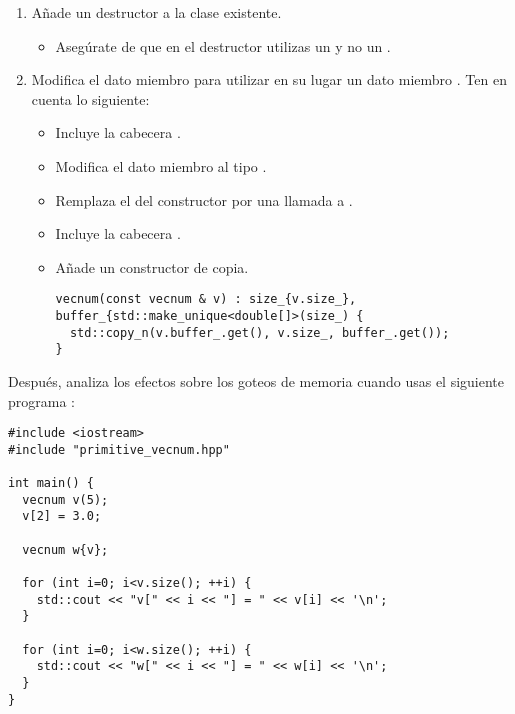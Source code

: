 \begin{enumerate}

\item Añade un destructor a la clase existente.
\begin{itemize}
  \item Asegúrate de que en el destructor utilizas 
        un   
        y no un  .
\end{itemize}

\item Modifica el dato miembro  
para utilizar en su lugar un dato miembro .
Ten en cuenta lo siguiente:

\begin{itemize}
  \item Incluye la cabecera .
  \item Modifica el dato miembro  al tipo .
  \item Remplaza el  del constructor por una llamada a .
  \item Incluye la cabecera .
  \item Añade un constructor de copia.
\begin{lstlisting}
vecnum(const vecnum & v) : size_{v.size_}, buffer_{std::make_unique<double[]>(size_) {
  std::copy_n(v.buffer_.get(), v.size_, buffer_.get());
}
\end{lstlisting}
\end{itemize}

\end{enumerate}

Después, analiza los efectos sobre los goteos de memoria cuando usas el siguiente programa :

\begin{lstlisting}
#include <iostream>
#include "primitive_vecnum.hpp"

int main() {
  vecnum v(5);
  v[2] = 3.0;

  vecnum w{v};

  for (int i=0; i<v.size(); ++i) {
    std::cout << "v[" << i << "] = " << v[i] << '\n';
  }

  for (int i=0; i<w.size(); ++i) {
    std::cout << "w[" << i << "] = " << w[i] << '\n';
  }
}
\end{lstlisting}

